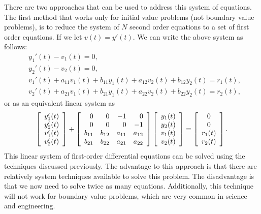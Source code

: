 There are two approaches that can be used to address this system of equations. The first method that works only for initial value problems (not boundary value problems), is to reduce the system of $N$ second order equations to a set of first order equations. If we let $v(t) = y'(t)$. We can write the above system as follows:
\begin{align}
  &y_1'(t) - v_1(t) = 0, \nonumber \\
  &y_2'(t) - v_2(t) = 0, \nonumber \\
  &v_1'(t) + a_{11} v_1(t) + b_{11} y_1(t) + a_{12} v_2(t) + b_{12} y_2(t) = r_1(t), \nonumber \\
  &v_2'(t) + a_{21} v_1(t) + b_{21} y_1(t) + a_{22} v_2(t) + b_{22} y_2(t) = r_2(t),
\end{align}
or as an equivalent linear system as
\begin{align}
  \left[ \begin{array}{c} y_1'(t) \\ y_2'(t) \\ v_1'(t) \\ v_2'(t) \\ \end{array} \right] +
  \left[ \begin{array}{r r r r}
      0  &      0 &     -1 &      0 \\
      0  &      0 &      0 &     -1 \\
  b_{11} & b_{12} & a_{11} & a_{12} \\
  b_{21} & b_{22} & a_{21} & a_{22} \\  \end{array} \right]
  \left[ \begin{array}{c} y_1(t) \\ y_2(t) \\ v_1(t) \\ v_2(t) \\ \end{array} \right] =
  \left[ \begin{array}{c} 0 \\ 0 \\ r_1(t) \\ r_2(t) \\ \end{array} \right] .
\end{align}
This linear system of first-order differential equations can be solved using the techniques discussed previously. The advantage to this approach is that there are relatively system techniques available to solve this problem. The disadvantage is that we now need to solve twice as many equations. Additionally, this technique will not work for boundary value problems, which are very common in science and engineering.


